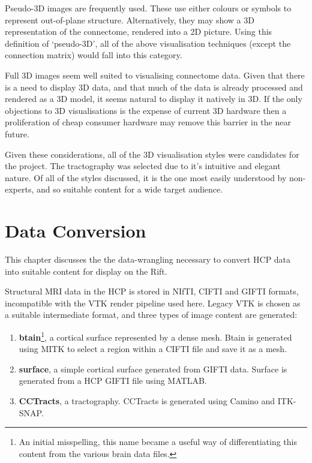\documentclass[MSc,paper=a4,pagesize=auto]{icldt}
\begin{document}
Pseudo-3D images are frequently used. These use either colours or symbols to represent out-of-plane structure. Alternatively, they may show a 3D representation of the connectome, rendered into a 2D picture. Using this definition of ‘pseudo-3D’, all of the above visualisation techniques (except the connection matrix) would fall into this category. 

Full 3D images seem well suited to visualising connectome data. Given that there is a need to display 3D data, and that much of the data is already processed and rendered as a 3D model, it seems natural to display it natively in 3D. If the only objections to 3D visualisations is the expense of current 3D hardware \cite{Margulies2013} then a proliferation of cheap consumer hardware may remove this barrier in the near future.

Given these considerations, all of the 3D visualisation styles were candidates for the project. The tractography was selected due to it's intuitive and elegant nature. Of all of the styles discussed, it is the one most easily understood by non-experts, and so suitable content for a wide target audience.

\chapter{Data Conversion}

This chapter discusses the the data-wrangling necessary to convert HCP data into suitable content for display on the Rift. 

Structural MRI data in the HCP is stored in NIfTI, CIFTI and GIFTI formats, incompatible with the VTK render pipeline used here. Legacy VTK is chosen as a suitable intermediate format, and three types of image content are generated: 

\begin{enumerate}
\item \textbf{btain}\footnote{An initial misspelling, this name became a useful way of differentiating this content from the various brain data files.}, a cortical surface represented by a dense mesh. Btain is generated using MITK to select a region within a CIFTI file and save it as a mesh.
\item \textbf{surface}, a simple cortical surface generated from GIFTI data. Surface is generated from a HCP GIFTI file using MATLAB.
\item \textbf{CCTracts}, a tractography. CCTracts is generated using Camino and ITK-SNAP.
\end{enumerate}
\end{document}
